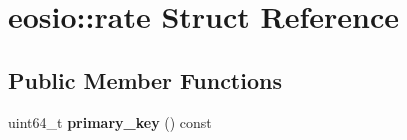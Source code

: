 \hypertarget{structeosio_1_1rate}{}\section{eosio\+:\+:rate Struct Reference}
\label{structeosio_1_1rate}
\subsection*{Public Member Functions}
\begin{DoxyCompactItemize}
\item 
\mbox{\label{structeosio_1_1rate_af0eeb96c32ed0db087970ad1bf09f192}} 
uint64\+\_\+t {\bfseries primary\+\_\+key} () const
\end{DoxyCompactItemize}
